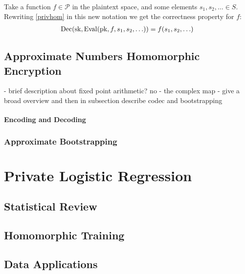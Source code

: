 Take a function $f\in\mathcal P$ in the plaintext space, and some elements $s_1,s_2,\ldots\in S$. Rewriting \ref{privhom} in this new notation we get the correctness property for $f$:
\begin{align*}
    \operatorname{Dec}(\operatorname{sk},\operatorname{Eval}(\operatorname{pk},f,s_1,s_2,\ldots))=f(s_1,s_2,\ldots)
\end{align*}




\section{Approximate Numbers Homomorphic Encryption}
\label{sec:ckks}

- brief description about fixed point arithmetic? no 
- the complex map 
- give a broad overview and then in subsection describe codec and bootstrapping

\subsubsection{Encoding and Decoding}


\subsection{Approximate Bootstrapping}

\chapter{Private Logistic Regression}
\section{Statistical Review}
\section{Homomorphic Training}
\section{Data Applications}


\label{ch:algebra}

